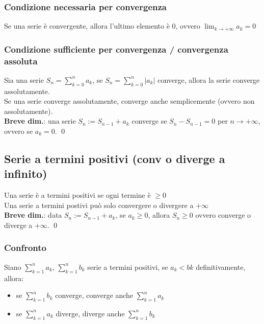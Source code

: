 \documentclass[a4paper]{article}
\begin{document}
\subsubsection*{Condizione necessaria per convergenza}
Se una serie è convergente, allora l'ultimo elemento è 0, ovvero \(\displaystyle \lim_{k \to +\infty} a_k = 0\)

\subsubsection*{Condizione sufficiente per convergenza / convergenza assoluta}
Sia una serie \(\displaystyle S_n = \sum_{k = 0}^{n} a_k\), se \(\displaystyle S_n = \sum_{k = 0}^{n} \left| a_k \right|\) converge, allora la serie converge assolutamente. \\
Se una serie converge assolutamente, converge anche semplicemente (ovvero non assolutamente). \\
\textbf{Breve dim.}: una serie \(S_n := S_{n-1} + a_k\) converge se \(S_n - S_{n-1} = 0\) per \(n \to +\infty\), ovvero se \(a_k = 0\). \qed

\subsection{Serie a termini positivi (conv o diverge a infinito)}
Una serie è a termini positivi se ogni termine è \(\geq 0\) \\ 
Una serie a termini postivi può solo convergere o divergere a \(+ \infty\) \\
\textbf{Breve dim.}: data \(S_n := S_{n-1} + a_k\), se \(a_k \geq 0\), allora \(S_n \geq 0\) ovvero converge o diverge a \(+\infty\). \qed

\subsubsection*{Confronto}
Siano \(\displaystyle \sum_{k = 1}^{n} a_k\), \(\displaystyle \sum_{k = 1}^{n} b_k\) serie a termini positivi, se \(a_k < bk\) definitivamente, allora:
\begin{itemize}
	\item se \( \sum_{k = 1}^{n} b_k\) converge, converge anche \(\sum_{k = 1}^{n} a_k\)
	\item se \(\sum_{k = 1}^{n} a_k\) diverge, diverge anche \(\sum_{k = 1}^{n} b_k\)
\end{itemize}
\end{document}
